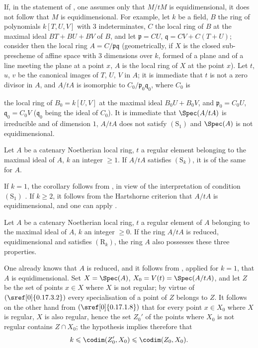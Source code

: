 \begin{remark}[5.12.3]
\label{IV.5.12.3}
If, in the statement of , one assumes only that $M/tM$ is equidimensional, it does not follow that $M$ is equidimensional.
For example, let $k$ be a field, $B$ the ring of polynomials $k[T,U,V]$ with $3$ indeterminates, $C$ the local ring of $B$ at the maximal ideal $BT+BU+BV$ of $B$, and let $\mathfrak{p}=CU$, $\mathfrak{q}=CV+C(T+U)$; consider then the local ring $A=C/\mathfrak{p}\mathfrak{q}$ (geometrically, if $X$ is the closed sub-prescheme of affine space with $3$ dimensions over $k$, formed of a plane and of a line meeting the plane at a point $x$, $A$ is the local ring of $X$ at the point $x$).
Let $t$, $u$, $v$ be the canonical images of $T$, $U$, $V$ in $A$; it is immediate that $t$ is not a zero divisor in $A$, and $A/tA$ is isomorphic to $C_0/\mathfrak{p}_0\mathfrak{q}_0$, where $C_0$ is


the local ring of $B_0=k[U,V]$ at the maximal ideal $B_0U+B_0V$, and $\mathfrak{p}_0=C_0U$, $\mathfrak{q}_0=C_0V$ ($\mathfrak{q}_0$ being the ideal of $C_0$).
It is immediate that $\Spec(A/tA)$ is irreducible and of dimension $1$, $A/tA$ does not satisfy $(\mathrm{S}_1)$ and $\Spec(A)$ is not equidimensional.
\end{remark}

\begin{corollary}[5.12.4]
\label{IV.5.12.4}
Let $A$ be a catenary Noetherian local ring, $t$ a regular element belonging to the maximal ideal of $A$, $k$ an integer $\geqslant 1$.
If $A/tA$ satisfies $(\mathrm{S}_k)$, it is of the same for $A$.
\end{corollary}

If $k=1$, the corollary follows from , in view of the interpretation of condition $(\mathrm{S}_1)$ .
If $k\geqslant 2$, it follows from the Hartshorne criterion  that $A/tA$ is equidimensional, and one can apply .

\begin{proposition}[5.12.5]
\label{IV.5.12.5}
Let $A$ be a catenary Noetherian local ring, $t$ a regular element of $A$ belonging to the maximal ideal of $A$, $k$ an integer $\geqslant 0$.
If the ring $A/tA$ is reduced, equidimensional and satisfies $(\mathrm{R}_k)$, the ring $A$ also possesses these three properties.
\end{proposition}

One already knows  that $A$ is reduced, and it follows from , applied for $k=1$, that $A$ is equidimensional.
Set $X=\Spec(A)$, $X_0=V(t)=\Spec(A/tA)$, and let $Z$ be the set of points $x\in X$ where $X$ is not regular; by virtue of $(\sref[0]{0.17.3.2})$ every specialisation of a point of $Z$ belongs to $Z$.
It follows on the other hand from $(\sref[0]{0.17.1.8})$ that for every point $x\in X_0$ where $X$ is regular, $X$ is also regular, hence the set $Z_0'$ of the points where $X_0$ is not regular contains $Z\cap X_0$; the hypothesis implies therefore that
\[
  k\leqslant\codim(Z_0',X_0)\leqslant\codim(Z_0,X_0).
\]

